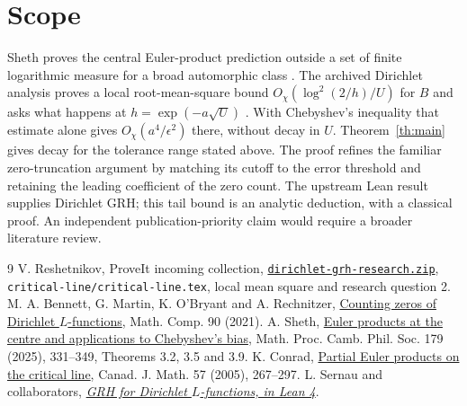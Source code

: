 \documentclass[11pt]{article}
\begin{document}
\section{Scope}
Sheth proves the central Euler-product prediction outside a set of finite
logarithmic measure for a broad automorphic class \cite{sheth}. The
archived Dirichlet analysis proves a local root-mean-square bound
$O_\chi(\log^2(2/h)/U)$ for $B$ and asks what happens at
$h=\exp(-a\sqrt U)$ \cite{in}. With Chebyshev's inequality that estimate
alone gives $O_\chi(a^4/\epsilon^2)$ there, without decay in $U$.
Theorem~\ref{th:main} gives decay for the tolerance range stated above.
The proof refines the familiar zero-truncation argument by matching its
cutoff to the error threshold and retaining the leading coefficient of the
zero count. The upstream Lean result supplies Dirichlet GRH; this tail
bound is an analytic deduction, with a classical proof. An independent
publication-priority claim would require a broader literature review.
\begin{thebibliography}{9}
 V. Reshetnikov, ProveIt incoming collection,
\href{https://github.com/VladimirReshetnikov/ProveIt/blob/d31039a48d963692e5a5176f47b6603fc9e9d9cf/docs/incoming/dirichlet-grh-research.zip}{\texttt{dirichlet-grh-research.zip}},
\texttt{critical-line/critical-line.tex}, local mean square and research question 2.
 M. A. Bennett, G. Martin, K. O'Bryant and A. Rechnitzer,
\href{https://doi.org/10.1090/mcom/3599}{Counting zeros of Dirichlet
$L$-functions}, Math. Comp. 90 (2021).
 A. Sheth,
\href{https://doi.org/10.1017/S0305004125000234}{Euler products at the
centre and applications to Chebyshev's bias}, Math. Proc. Camb. Phil.
Soc. 179 (2025), 331--349, Theorems 3.2, 3.5 and 3.9.
 K. Conrad,
\href{https://doi.org/10.4153/CJM-2005-012-6}{Partial Euler products
on the critical line}, Canad. J. Math. 57 (2005), 267--297.
 L. Sernau and collaborators,
\href{https://github.com/lsernau/grh-lean/tree/72fead102f663d5c7a407964a13dc0cf9d977207}{\emph{GRH for Dirichlet $L$-functions, in Lean 4}}.
\end{thebibliography}
\end{document}
